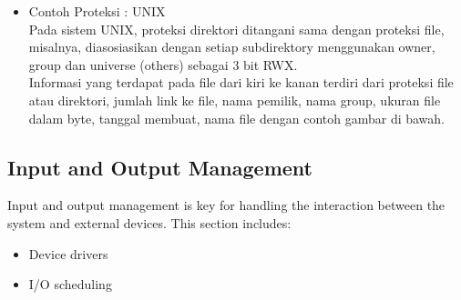 \documentclass[12pt]{article}
\begin{document}
\begin{itemiz;[e}
\begin{itemize}
\\Bila user meminta akses ke file khusus, sistem operasi memeriksa access list. Jika user tersebut terdaftar, akses diijinkan, sebaliknya terjadi protection violation dan dilarang mengakses file. 
\\Masalah pokok dengan access list adalah ukuran. Jika ingin mengijinkan user membaca file, harus didaftar semua user dengan akses read. Teknik ini mempunyai dua konsekuensi yaitu membangun sebuah daftar mungkin kesulitan dan directory entry yang sebelumnya mempunyai ukuran tetap sekarang menjadi ukuran bervariasi, sehingga muncul permasalahan manajemen ruang. 
\\Masalah ini dipecahkan dengan melakukan pengetatan terhadap access list. Beberapa system memperkenalkan tiga klasifikasi user: 
\begin{itemize}
    \item Owner: User yang membuat file  
    \item Group: Kumpulan user yang menggunakan file bersama-sama dan memerlukan akses yang sama  
    \item Universe: Semua user lain dalam system. 
    \\Agar sistem diatas bekerja dg baik, keanggotaan group harus dikontrol secara ketat. Sebagai contoh, dalam sistem UNIX, group dapat dibuat dan dimodifikasi hanya oleh manager (superuser). 
\end{itemize}
\item Contoh Proteksi : UNIX 
\\Pada sistem UNIX, proteksi direktori ditangani sama dengan proteksi file, misalnya, diasosiasikan dengan setiap subdirektory menggunakan owner, group dan universe (others) sebagai 3 bit RWX. 
\\Informasi yang terdapat pada file dari kiri ke kanan terdiri dari proteksi file atau direktori, jumlah link ke file, nama pemilik, nama group, ukuran file dalam byte, tanggal membuat, nama file dengan contoh gambar di bawah. 
\end{itemize}

\subsection{Input and Output Management}
Input and output management is key for handling the interaction between the system and external devices. This section includes:
\begin{itemize}
    \item Device drivers
    \item I/O scheduling
\end{itemize}


\end{itemiz;[e}
\end{document}
